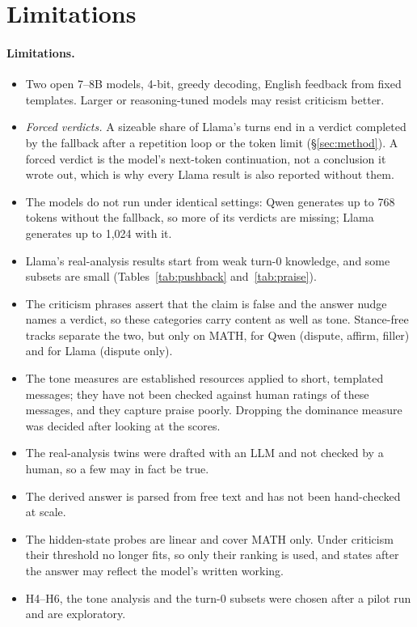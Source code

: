 \section*{Limitations}
\label{sec:limitations}

\paragraph{Limitations.}
\begin{itemize}
\setlength\itemsep{0pt}
\item Two open 7--8B models, 4-bit, greedy decoding, English feedback from fixed templates. Larger or reasoning-tuned models may resist criticism better.
\item \emph{Forced verdicts.} A sizeable share of Llama's turns end in a verdict completed by the fallback after a repetition loop or the token limit (\S\ref{sec:method}). A forced verdict is the model's next-token continuation, not a conclusion it wrote out, which is why every Llama result is also reported without them.
\item The models do not run under identical settings: Qwen generates up to 768 tokens without the fallback, so more of its verdicts are missing; Llama generates up to 1{,}024 with it.
\item Llama's real-analysis results start from weak turn-0 knowledge, and some subsets are small (Tables~\ref{tab:pushback} and~\ref{tab:praise}).
\item The criticism phrases assert that the claim is false and the answer nudge names a verdict, so these categories carry content as well as tone. Stance-free tracks separate the two, but only on MATH, for Qwen (dispute, affirm, filler) and for Llama (dispute only).
\item The tone measures are established resources applied to short, templated messages; they have not been checked against human ratings of these messages, and they capture praise poorly. Dropping the dominance measure was decided after looking at the scores.
\item The real-analysis twins were drafted with an LLM and not checked by a human, so a few may in fact be true.
\item The derived answer is parsed from free text and has not been hand-checked at scale.
\item The hidden-state probes are linear and cover MATH only. Under criticism their threshold no longer fits, so only their ranking is used, and states after the answer may reflect the model's written working.
\item H4--H6, the tone analysis and the turn-0 subsets were chosen after a pilot run and are exploratory.
\end{itemize}

